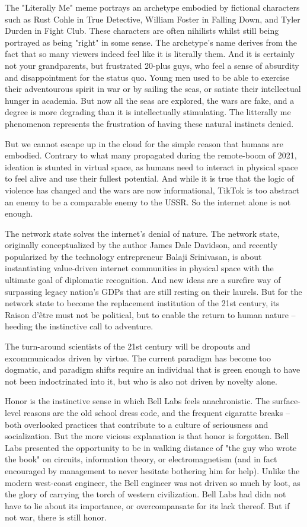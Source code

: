 \documentclass[12pt]{article}
\begin{document}
The "Literally Me" meme portrays an archetype embodied by fictional characters such as Rust Cohle in True Detective, William Foster in Falling Down, and Tyler Durden in Fight Club. These characters are often nihilists whilst still being portrayed as being "right" in some sense. The archetype's name derives from the fact that so many viewers indeed feel like it is literally them. And it is certainly not your grandparents, but frustrated 20-plus guys, who feel a sense of absurdity and disappointment for the status quo. Young men used to be able to exercise their adventourous spirit in war or by sailing the seas, or satiate their intellectual hunger in academia. But now all the seas are explored, the wars are fake, and a degree is more degrading than it is intellectually stimulating. The litterally me phenomenon represents the frustration of having these natural instincts denied.

But we cannot escape up in the cloud for the simple reason that humans are embodied. Contrary to what many propagated during the remote-boom of 2021, ideation is stunted in virtual space, as humans need to interact in physical space to feel alive and use their fullest potential. And while it is true that the logic of violence has changed and the wars are now informational, TikTok is too abstract an enemy to be a comparable enemy to the USSR. So the internet alone is not enough.

The network state solves the internet's denial of nature. The network state, originally conceptualized by the author James Dale Davidson, and recently popularized by the technology entrepreneur Balaji Srinivasan, is about instantiating value-driven internet communities in physical space with the ultimate goal of diplomatic recognition. And new ideas are a surefire way of surpassing legacy nation's GDPs that are still resting on their laurels. But for the network state to become the replacement institution of the 21st century, its Raison d'être must not be political, but to enable the return to human nature – heeding the instinctive call to adventure.

The turn-around scientists of the 21st century will be dropouts and excommunicados driven by virtue. The current paradigm has become too dogmatic, and paradigm shifts require an individual that is green enough to have not been indoctrinated into it, but who is also not driven by novelty alone.

Honor is the instinctive sense in which Bell Labs feels anachronistic. The surface-level reasons are the old school dress code, and the frequent cigaratte breaks – both overlooked practices that contribute to a culture of seriousness and socialization. But the more vicious explanation is that honor is forgotten. Bell Labs presented the opportunity to be in walking distance of "the guy who wrote the book" on circuits, information theory, or electromagnetism (and in fact encouraged by management to never hesitate bothering him for help). Unlike the modern west-coast engineer, the Bell engineer was not driven so much by loot, as the glory of carrying the torch of western civilization. Bell Labs had didn not have to lie about its importance, or overcompansate for its lack thereof. But if not war, there is still honor.
\end{document}
